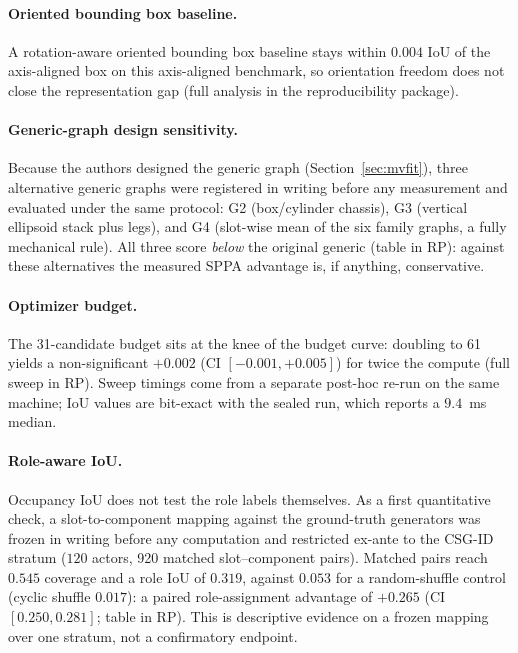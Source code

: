 \documentclass[11pt,a4paper]{article}
\begin{document}
\paragraph{Oriented bounding box baseline.}
A rotation-aware oriented bounding box baseline stays within \(0.004\) IoU of
the axis-aligned box on this axis-aligned benchmark, so orientation freedom
does not close the representation gap (full analysis in the reproducibility
package).

\paragraph{Generic-graph design sensitivity.}
\label{sec:generic-sensitivity}
Because the authors designed the generic graph (Section~\ref{sec:mvfit}),
three alternative generic graphs were registered in writing before any
measurement and evaluated under the same protocol: G2 (box/cylinder chassis),
G3 (vertical ellipsoid stack plus legs), and G4 (slot-wise mean of the six
family graphs, a fully mechanical rule). All three score \emph{below} the
original generic (table in RP): against these
alternatives the measured SPPA advantage is, if anything, conservative.

\paragraph{Optimizer budget.}
The 31-candidate budget sits at the knee of the budget curve: doubling to 61
yields a non-significant \(+0.002\) (CI \([-0.001,+0.005]\)) for twice the
compute (full sweep in RP). Sweep timings
come from a separate post-hoc re-run on the same machine; IoU values are
bit-exact with the sealed run, which reports a \(9.4\)~ms median.

\paragraph{Role-aware IoU.}
Occupancy IoU does not test the role labels themselves. As a first
quantitative check, a slot-to-component mapping against the ground-truth
generators was frozen in writing before any computation and restricted
ex-ante to the CSG-ID stratum (\(120\) actors, 920 matched slot--component
pairs). Matched pairs reach \(0.545\) coverage and a role IoU of \(0.319\),
against \(0.053\) for a random-shuffle control (cyclic shuffle \(0.017\)): a
paired role-assignment advantage of \(+0.265\) (CI \([0.250,0.281]\); table in
RP). This is
descriptive evidence on a frozen mapping over one stratum, not a confirmatory
endpoint.
\end{document}

